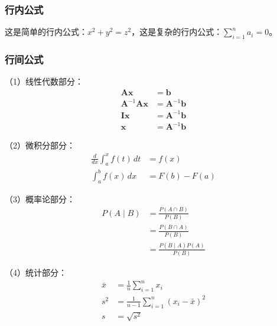 \begin{ujnbody}
    \subsubsection{行内公式}
    这是简单的行内公式：$x^2+y^2=z^2$，这是复杂的行内公式：$\sum_{i=1}^n a_i=0$。
    \subsubsection{行间公式}
    （1）线性代数部分：
    \begin{equation}
        \begin{split}
            \mathbf{A}\mathbf{x} &= \mathbf{b} \\
            \mathbf{A}^{-1}\mathbf{A}\mathbf{x} &= \mathbf{A}^{-1}\mathbf{b} \\
            \mathbf{I}\mathbf{x} &= \mathbf{A}^{-1}\mathbf{b} \\
            \mathbf{x} &= \mathbf{A}^{-1}\mathbf{b}
        \end{split}
    \end{equation}

    （2）微积分部分：
    \begin{equation}
        \begin{split}
            \frac{d}{dx} \int_a^x f(t)\,dt &= f(x) \label{eq:2} \\
            \int_a^b f(x)\,dx &= F(b)-F(a)
        \end{split}
    \end{equation}

    （3）概率论部分：
    \begin{equation}
        \begin{split}
            P(A \mid B) &= \frac{P(A \cap B)}{P(B)} \\
            &= \frac{P(B \cap A)}{P(B)} \\
            &= \frac{P(B \mid A)P(A)}{P(B)}
        \end{split}
    \end{equation}

    （4）统计部分：
    \begin{equation}
        \begin{split}
            \bar{x} &= \frac{1}{n}\sum_{i=1}^n x_i \\
            s^2 &= \frac{1}{n-1}\sum_{i=1}^n (x_i-\bar{x})^2 \\
            s &= \sqrt{s^2}
        \end{split}
    \end{equation}


\end{ujnbody}
